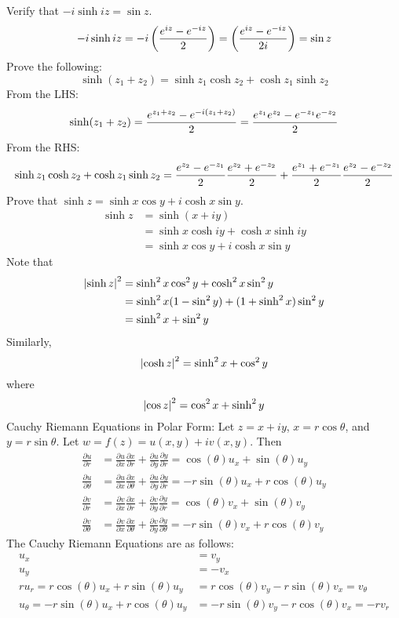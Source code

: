 \documentclass[12pt]{article}
\begin{document}
 Verify that $-i\sinh iz = \sin z$. $$ -i\sinh iz = -i \left( \frac{e^{iz} - e^{-iz}}{2}\right) = \left( \frac{e^{iz} - e^{-iz}}{2i}\right) = \sin z $$
 Prove the following: $$\sinh (z_1 + z_2) = \sinh z_1 \cosh z_2 + \cosh z_1 \sinh z_2 $$
 From the LHS: $$ \sinh (z_1 + z_2) = \frac{e^{z_1 + z_2} - e^{-i(z_1 + z_2)}}{2} = \frac{e^{z_1}e^{z_2} - e^{-z_1}e^{-z_2}}{2} $$ 
 From the RHS: $$ \sinh z_1 \cosh z_2 + \cosh z_1 \sinh z_2 = \frac{e^{z_2} - e^{-z_1}}{2} \frac{e^{z_2} + e^{-z_2}}{2} + \frac{e^{z_1} + e^{-z_1}}{2} \frac{e^{z_2} - e^{-z_2}}{2} $$ 
 Prove that $\sinh z = \sinh x \cos y + i \cosh x \sin y $. 
 $$ \begin{aligned} \sinh z &= \sinh (x+iy) \\ &= \sinh x \cosh iy + \cosh x \sinh iy \\ &= \sinh x \cos y + i\cosh x \sin y \end{aligned} $$ 
 Note that $$ \begin{aligned} 
 \abs{\sinh z}^2 &= \sinh^2 x \cos^2 y + \cosh^2 x \sin^2 y \\ &= \sinh^2x(1-\sin^2 y) + (1 + \sinh^2 x)\sin^2 y \\ &= \sinh^2 x + \sin^2 y \end{aligned} $$ 
 Similarly, $$ \abs{\cosh z}^2 = \sinh^2 x + \cos^2 y $$ 
 where $$ \abs{\cos z}^2 = \cos^2 x + \sinh^2 y $$ 
 Cauchy Riemann Equations in Polar Form: Let $z = x+iy$, $x = r\cos \theta$, and $y = r\sin \theta$. Let $w = f(z) = u(x,y) + iv(x,y)$. Then $$ \begin{aligned} 
 \frac{\partial u}{\partial r} &= \frac{\partial u}{\partial x}\frac{\partial x}{\partial r} + \frac{\partial u}{\partial y}\frac{\partial y}{\partial r} = \cos(\theta)u_x + \sin(\theta)u_y \\ 
 \frac{\partial u}{\partial \theta} &= \frac{\partial u}{\partial x}\frac{\partial x}{\partial \theta} + \frac{\partial u}{\partial y}\frac{\partial y}{\partial r} = -r\sin(\theta)u_x + r\cos(\theta)u_y \\ 
 \frac{\partial v}{\partial r} &= \frac{\partial v}{\partial x}\frac{\partial x}{\partial r} + \frac{\partial v}{\partial y}\frac{\partial y}{\partial r} = \cos(\theta)v_x + \sin(\theta)v_y \\ 
 \frac{\partial v}{\partial \theta} &= \frac{\partial v}{\partial x}\frac{\partial x}{\partial \theta} + \frac{\partial v}{\partial y}\frac{\partial y}{\partial \theta} = -r\sin(\theta)v_x + r\cos(\theta)v_y \end{aligned} $$ 
 The Cauchy Riemann Equations are as follows: $$ \begin{aligned} 
 u_x &= v_y \\ u_y &= -v_x \\ ru_r = r\cos(\theta)u_x + r\sin(\theta)u_y &= r\cos(\theta)v_y - r\sin(\theta)v_x = v_\theta \\ u_\theta = -r\sin(\theta)u_x + r\cos(\theta)u_y &= -r\sin(\theta)v_y - r\cos(\theta)v_x = -rv_r \end{aligned} $$ 
\end{document}
